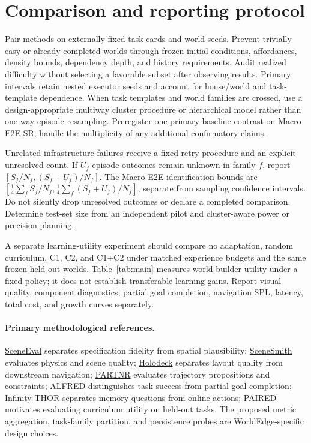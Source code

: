 \documentclass[10pt,a4paper]{article}
\begin{document}
\section{Comparison and reporting protocol}
Pair methods on externally fixed task cards and world seeds. Prevent trivially easy or already-completed worlds through frozen initial conditions, affordances, density bounds, dependency depth, and history requirements. Audit realized difficulty without selecting a favorable subset after observing results. Primary intervals retain nested executor seeds and account for house/world and task-template dependence. When task templates and world families are crossed, use a design-appropriate multiway cluster procedure or hierarchical model rather than one-way episode resampling. Preregister one primary baseline contrast on Macro E2E SR; handle the multiplicity of any additional confirmatory claims.

Unrelated infrastructure failures receive a fixed retry procedure and an explicit unresolved count. If $U_f$ episode outcomes remain unknown in family $f$, report $[S_f/N_f,(S_f+U_f)/N_f]$. The Macro E2E identification bounds are $[\frac14\sum_f S_f/N_f,\frac14\sum_f(S_f+U_f)/N_f]$, separate from sampling confidence intervals. Do not silently drop unresolved outcomes or declare a completed comparison. Determine test-set size from an independent pilot and cluster-aware power or precision planning.

A separate learning-utility experiment should compare no adaptation, random curriculum, C1, C2, and C1+C2 under matched experience budgets and the same frozen held-out worlds. Table~\ref{tab:main} measures world-builder utility under a fixed policy; it does not establish transferable learning gains. Report visual quality, component diagnostics, partial goal completion, navigation SPL, latency, total cost, and growth curves separately.

\paragraph{Primary methodological references.}
\href{https://arxiv.org/html/2503.14756v3}{SceneEval} separates specification fidelity from spatial plausibility;
\href{https://proceedings.mlr.press/v306/pfaff26a.html}{SceneSmith} evaluates physics and scene quality;
\href{https://arxiv.org/html/2312.09067}{Holodeck} separates layout quality from downstream navigation;
\href{https://arxiv.org/html/2411.00081}{PARTNR} evaluates trajectory propositions and constraints;
\href{https://arxiv.org/pdf/1912.01734}{ALFRED} distinguishes task success from partial goal completion;
\href{https://arxiv.org/html/2505.16928}{Infinity-THOR} separates memory questions from online actions;
\href{https://arxiv.org/html/2012.02096}{PAIRED} motivates evaluating curriculum utility on held-out tasks. The proposed metric aggregation, task-family partition, and persistence probes are WorldEdge-specific design choices.
\end{document}
